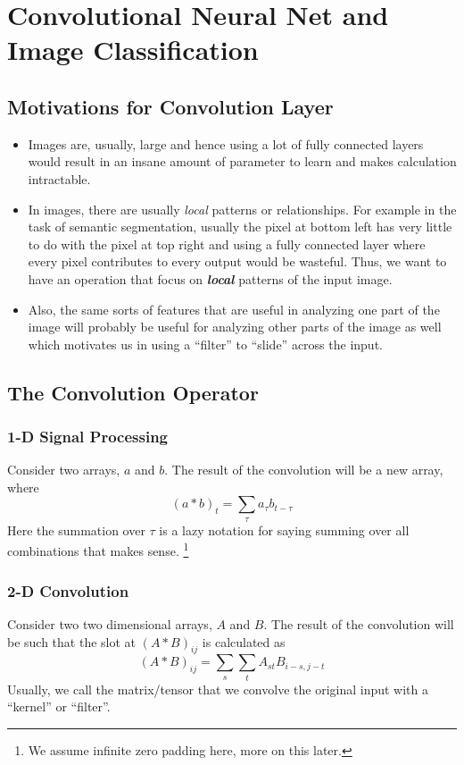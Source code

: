 \documentclass[11pt]{article}
\begin{document}
\section{Convolutional Neural Net and Image Classification}
\subsection{Motivations for Convolution Layer}
\begin{itemize}
    \item Images are, usually, large and hence using a lot of fully connected layers would result in an insane amount of parameter to learn and makes calculation intractable.
    \item In images, there are usually \textit{local} patterns or relationships. For example in the task of semantic segmentation, usually the pixel at bottom left has very little to do with the pixel at top right and using a fully connected layer where every pixel contributes to every output would be wasteful. Thus, we want to have an operation that focus on \textit{\textbf{local}} patterns of the input image.
    \item Also, the same sorts of features that are useful in analyzing one part of the image will probably be useful for analyzing other parts of the image as well which motivates us in using a ``filter'' to ``slide'' across the input. 
\end{itemize}

\subsection{The Convolution Operator}
\subsubsection{1-D Signal Processing} Consider two arrays, $a$ and $b$. The result of the convolution will be a new array, where
\begin{equation}
    (a * b)_{t}=\sum_{\tau} a_{\tau} b_{t-\tau}
\end{equation}
Here the summation over $\tau$ is a lazy notation for saying summing over all combinations that makes sense. \footnote{We assume infinite zero padding here, more on this later.}

\subsubsection{2-D Convolution}
Consider two two dimensional arrays, $A$ and $B$. The result of the convolution will be such that the slot at $(A\ast B)_{ij}$ is calculated as
\begin{equation}
    (A * B)_{i j}=\sum_{s} \sum_{t} A_{s t} B_{i-s, j-t}
\end{equation}
Usually, we call the matrix/tensor that we convolve the original input with a ``kernel'' or ``filter''. 
\end{document}
